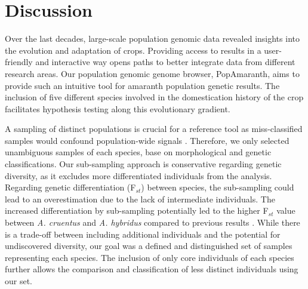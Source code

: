 \documentclass[9pt,twocolumn,twoside]{celabRxiv}
\begin{document}


 



\section{Discussion}

Over the last decades, large-scale population genomic data revealed insights into the evolution and adaptation of crops.
Providing access to results in a user-friendly and interactive way opens paths to better integrate data from different research areas.
Our population genomic genome browser, PopAmaranth, aims to provide such an intuitive tool for amaranth population genetic results.
The inclusion of five different species involved in the domestication history of the crop facilitates hypothesis testing along this evolutionary gradient.

A sampling of distinct populations is crucial for a reference tool as miss-classified samples would confound population-wide signals \citep{rieseberg2004plant, gutierrez2018genetic}. %
Therefore, we only selected unambiguous samples of each species, base on morphological and genetic classifications.
Our sub-sampling approach is conservative regarding genetic diversity, as it excludes more differentiated individuals from the analysis. 
Regarding genetic differentiation (F$_{st}$) between species, the sub-sampling could lead to an overestimation due to the lack of intermediate individuals. 
The increased differentiation by sub-sampling potentially led to the higher F$_{st}$ value between \textit{A. cruentus} and \textit{A. hybridus} compared to previous results \citep{stetter2020parallel}.
While there is a trade-off between including additional individuals and the potential for undiscovered diversity, our goal was a defined and distinguished set of samples representing each species.
The inclusion of only core individuals of each species further allows the comparison and classification of less distinct individuals using our set.
\end{document}

